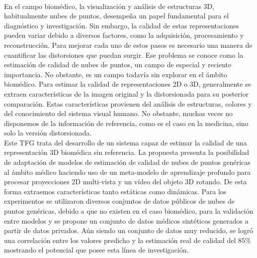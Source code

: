 \chapter*{}


% 


\thispagestyle{empty}

\begin{center}
{\large\bfseries \myTitle}\\
\end{center}
\begin{center}
\myName\\
\end{center}

\\

\\
En el campo biomédico, la visualización y análisis de estructuras 3D, 
habitualmente nubes de puntos, desempeña un papel fundamental para el diagnóstico y investigación. 
Sin embargo, la calidad de estas representaciones pueden variar debido a diversos factores, como la adquisición, procesamiento y reconstrucción. 
Para mejorar cada uno de estos pasos es necesario una manera de cuantificar las distorsiones que puedan surgir. 
Ese problema se conoce como la estimación de calidad de nubes de puntos, 
un campo de especial y reciente importancia. No obstante, 
es un campo todavía sin explorar en el ámbito biomédico.
Para estimar la calidad de representaciones 2D o 3D, generalmente se extraen características de la imagen original y la distorsionada para su posterior 
comparación. Estas características provienen del análisis de estructuras, colores y 
del conocimiento del sistema visual humano. No obstante, 
muchas veces no disponemos de la información de referencia, como es el caso en 
la medicina, sino solo la versión distorsionada.
\\

Este TFG trata del desarrollo de un sistema capaz de estimar la calidad de 
una representación 3D biomédica sin referencia. La propuesta presenta la posibilidad de 
adaptación de modelos de estimación de calidad de nubes de puntos genéricas 
al ámbito médico haciendo uso de un meta-modelo de aprendizaje profundo para 
procesar proyecciones 2D multi-vista y un vídeo del objeto 3D rotando. 
De esta forma extraemos características tanto estáticas como dinámicas.
Para los experimentos se utilizaron diversos conjuntos de datos públicos 
de nubes de puntos genéricas, debido a que no existen en el caso biomédico, 
para la validación entre modelos y se propone un conjunto de datos médicos 
sintéticos generados a partir de datos privados. Aún siendo un conjunto de datos 
muy reducido, se logró una correlación entre los valores predicho y la 
estimación real de calidad del 85\% mostrando el potencial que posee esta línea de investigación.

